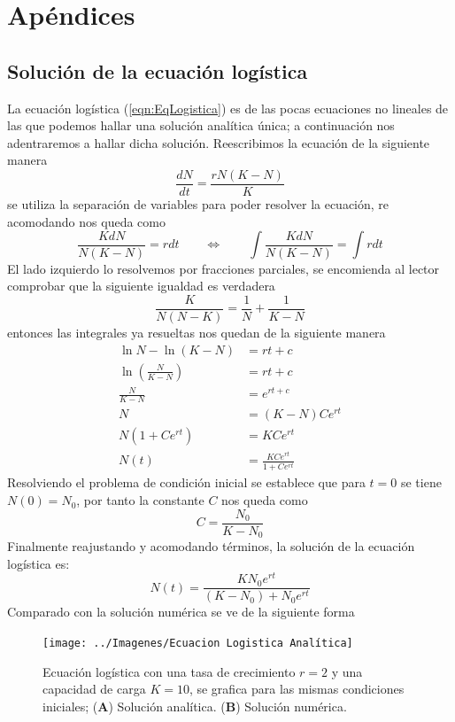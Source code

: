 \chapter{Apéndices}\label{ch:Ap}

\section{Solución de la ecuación logística}\label{sec:SolEqLogistica}

La ecuación logística (\ref{eqn:EqLogistica}) es de las pocas ecuaciones no lineales de las que podemos hallar una solución analítica única; a continuación nos adentraremos a hallar dicha solución. Reescribimos la ecuación de la siguiente manera
$$\frac{dN}{dt}=\frac{rN(K-N)}{K}$$
se utiliza la separación de variables para poder resolver la ecuación, re acomodando nos queda como
$$\frac{KdN}{N(K-N)}=rdt\qquad\Longleftrightarrow\qquad \int\frac{KdN}{N(K-N)}=\int rdt$$
El lado izquierdo lo resolvemos por fracciones parciales, se encomienda al lector comprobar que la siguiente igualdad es verdadera
$$\frac{K}{N(N-K)}=\frac{1}{N}+\frac{1}{K-N}$$
entonces las integrales ya resueltas nos quedan de la siguiente manera
\begin{align*}
	\ln N-\ln(K-N)&=rt+c \\
	\ln\left (\frac{N}{K-N}\right ) &= rt+c\\
	\frac{N}{K-N}&=e^{rt+c}\\
	N&=(K-N)Ce^{rt}\\
	N(1+Ce^{rt})&=KCe^{rt}\\
	N(t)&=\frac{KCe^{rt}}{1+Ce^{rt}}
\end{align*}
Resolviendo el problema de condición inicial se establece que para $t=0$ se tiene $N(0)=N_0$, por tanto la constante $C$ nos queda como
$$C=\frac{N_0}{K-N_0}$$
Finalmente reajustando y acomodando términos, la solución de la ecuación logística es:
\begin{equation}\label{eqn:SolEqLogistica}
	N(t)=\frac{KN_0e^{rt}}{(K-N_0)+N_0e^{rt}}
\end{equation}
Comparado con la solución numérica se ve de la siguiente forma
\begin{figure}[h!]
	\centering
	\texttt{[image: ../Imagenes/Ecuacion Logistica Analítica]}
	\caption{Ecuación logística con una tasa de crecimiento $r=2$ y una capacidad de carga $K=10$, se grafica para las mismas condiciones iniciales; (\textbf{A}) Solución analítica. (\textbf{B}) Solución numérica.}
	\label{fig:EcuacionLogisticaAnalitica}
\end{figure}

